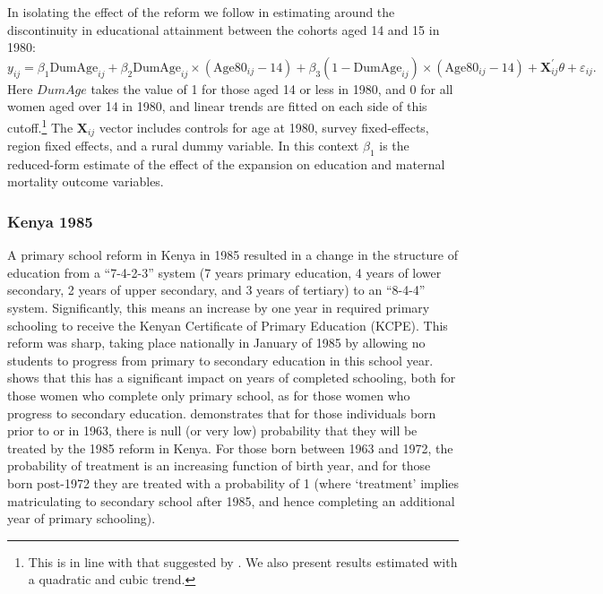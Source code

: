 \documentclass{article}[12pt,subeqn]
\begin{document}
\begin{spacing}{1.4}
In isolating the effect of the reform we follow \citet{AgueroBharawadj2011} in 
estimating around the discontinuity in educational attainment between the cohorts 
aged 14 and 15 in 1980: 
\begin{equation}
\label{eqn:Zimbabwe}
    y_{ij}=\beta_1\text{DumAge}_{ij}+
    \beta_2\text{DumAge}_{ij}\times(\text{Age}80_{ij}-14)+
    \beta_3(1-\text{DumAge}_{ij})\times(\text{Age}80_{ij}-14)+ 
    \textbf{X}^\prime_{ij}\theta+\varepsilon_{ij}.
\end{equation}
Here $DumAge$ takes the value of 1 for those aged 14 or less in 1980, and 0 for 
all women aged over 14 in 1980, and linear trends are fitted on each side of this 
cutoff.\footnote{This is in line with that suggested by 
\citet{AgueroBharawadj2011}.  We also present results estimated with a quadratic 
and cubic trend.} The $\textbf{X}_{ij}$ vector includes controls for age at 1980, 
survey fixed-effects, region fixed effects, and a rural dummy variable.  In this 
context $\beta_1$ is the reduced-form estimate of the effect of the expansion on 
education and maternal mortality outcome variables.

\subsubsection{Kenya 1985}
\label{ssscn:empiricsKenya}
A primary school reform in Kenya in 1985 resulted in a change in the structure of 
education from a ``7-4-2-3'' system (7 years primary education, 4 years of lower 
secondary, 2 years of upper secondary, and 3 years of tertiary) to an ``8-4-4'' 
system. Significantly, this means an increase by one year in required primary 
schooling to receive the Kenyan Certificate of Primary Education (KCPE). This 
reform was sharp, taking place nationally in January of 1985 by allowing no 
students to progress from primary to secondary education in this school 
year. \citet{Chicoine2011} shows that this has a significant impact on years of 
completed schooling, both for those women who complete only primary school, as for 
those women who progress to secondary education. \citet{Chicoine2011} demonstrates 
that for those individuals born prior to or in 1963, there is null (or very low)
probability that they will be treated by the 1985 reform in Kenya. For those born 
between 1963 and 1972, the probability of treatment is an increasing function of 
birth year, and for those born post-1972 they are treated with a probability of 1 
(where `treatment' implies matriculating to secondary school after 1985, and hence 
completing an additional year of primary schooling).


\end{spacing}
\end{document}
